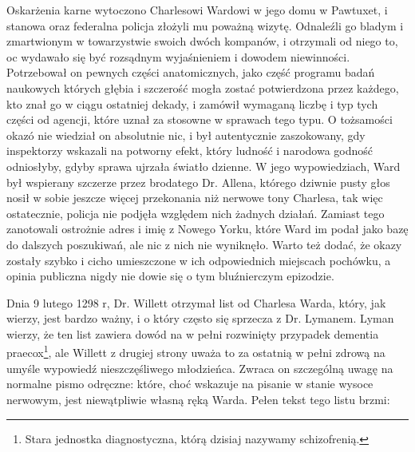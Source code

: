 Oskarżenia karne wytoczono Charlesowi Wardowi w jego domu w Pawtuxet, i stanowa oraz federalna policja złożyli mu poważną wizytę. Odnaleźli go bladym i zmartwionym w towarzystwie swoich dwóch kompanów, i otrzymali od niego to, oc wydawało się być rozsądnym wyjaśnieniem i dowodem niewinności. Potrzebował on pewnych części anatomicznych, jako część programu badań naukowych których głębia i szczerość mogła zostać potwierdzona przez każdego, kto znał go w ciągu ostatniej dekady, i zamówił wymaganą liczbę i typ tych części od agencji, które uznał za stosowne w sprawach tego typu. O tożsamości okazó nie wiedział on absolutnie nic, i był autentycznie zaszokowany, gdy inspektorzy wskazali na potworny efekt, który ludność i narodowa godność odniosłyby, gdyby sprawa ujrzała światło dzienne. W jego wypowiedziach, Ward był wspierany szczerze przez brodatego Dr. Allena, którego dziwnie pusty głos nosił w sobie jeszcze więcej przekonania niż nerwowe tony Charlesa, tak więc ostatecznie, policja nie podjęła względem nich żadnych działań. Zamiast tego zanotowali ostrożnie adres i imię z Nowego Yorku, które Ward im podał jako bazę do dalszych poszukiwań, ale nic z nich nie wyniknęło.  Warto też dodać, że okazy zostały szybko i cicho umieszczone w ich odpowiednich miejscach pochówku, a opinia publiczna nigdy nie dowie się o tym bluźnierczym epizodzie. 

Dnia 9 lutego 1298 r, Dr. Willett otrzymał list od Charlesa Warda, który, jak wierzy, jest bardzo ważny, i o który często się sprzecza z Dr. Lymanem. Lyman wierzy, że ten list zawiera dowód na w pełni rozwinięty przypadek dementia praecox\footnote{Stara jednostka diagnostyczna, którą dzisiaj nazywamy schizofrenią.}, ale Willett z drugiej strony uważa to za ostatnią w pełni zdrową na umyśle wypowiedź nieszczęśliwego młodzieńca. Zwraca on szczególną uwagę na normalne pismo odręczne: które, choć wskazuje na pisanie w stanie wysoce nerwowym, jest niewątpliwie własną ręką Warda. Pełen tekst tego listu brzmi:


